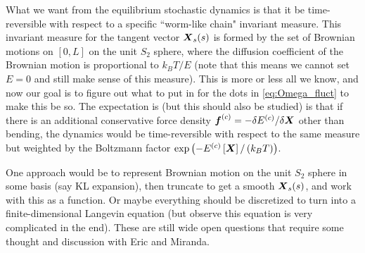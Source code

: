 What we want from the equilibrium stochastic dynamics is that it be time-reversible with respect to a specific ``worm-like chain" invariant measure. This invariant measure for the tangent vector $\boldsymbol{X}_s(s)$ is formed by the set of Brownian motions on $[0,L]$ on the unit $S_2$ sphere, where the diffusion coefficient of the Brownian motion is proportional to $k_B T / E$ (note that this means we cannot set $E=0$ and still make sense of this measure). This is more or less all we know, and now our goal is to figure out what to put in for the dots in \eqref{eq:Omega_fluct} to make this be so. The expectation is (but this should also be studied) is that if there is an additional conservative force density $\boldsymbol{f}^{(c)}=-\delta{E^{(c)}}/\delta{\boldsymbol{X}}$ other than bending, the dynamics would be time-reversible with respect to the same measure but weighted by the Boltzmann factor $\exp\left(-E^{(c)}\left[\boldsymbol{X}\right]/\left(k_B T\right)\right)$.

One approach would be to represent Brownian motion on the unit $S_2$ sphere in some basis (say KL expansion), then truncate to get a smooth $\boldsymbol{X}_s(s)$, and work with this as a function. Or maybe everything should be discretized to turn into a finite-dimensional Langevin equation (but observe this equation is very complicated in the end). These are still wide open questions that require some thought and discussion with Eric and Miranda.

